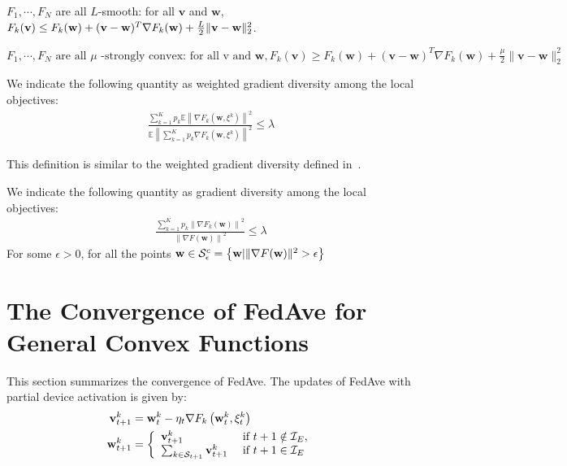 \begin{assumption}[L-smooth]
$F_{1}, \cdots, F_{N}$ are all $L$-smooth: for all  $\mathbf{v}$  and $\mathbf{w}$, $F_{k}(\mathbf{v}) \leq F_{k}(\mathbf{w})+(\mathbf{v}- \\ \mathbf{w})^{T} \nabla F_{k}(\mathbf{w})+\frac{L}{2}\|\mathbf{v}-\mathbf{w}\|_{2}^{2}$.
\label{ass:lsmooth}
\end{assumption}
\begin{assumption}
$	F_{1}, \cdots, F_{N} \text { are all } \mu \text { -strongly convex: for all v and } \mathbf{w}, F_{k}(\mathbf{v}) \geq F_{k}(\mathbf{w})+(\mathbf{v}-\mathbf{w})^{T} \nabla F_{k}(\mathbf{w})+\frac{\mu}{2}\|\mathbf{v}-\mathbf{w}\|_{2}^{2}$
\label{ass:stroncvx}
\end{assumption}

\begin{definition}
	We indicate the following quantity as weighted gradient diversity among the local 
	objectives:
	\begin{align*}
		\frac{\sum_{k=1}^K p_k  \mathbb{E}\left\|\nabla F_{k}\left(\mathbf{w}, \xi^{k}\right)\right\|^{2} }{\mathbb{E}\left\| \sum_{k=1}^K p_k   \nabla F_{k}\left(\mathbf{w}, \xi^{k}\right)\right\|^{2} } \leq \lambda 
	\end{align*}
\end{definition}
This definition is similar to the weighted gradient diversity defined in~\cite{haddadpour2019convergence}.

\begin{definition}
	We indicate the following quantity as gradient diversity among the local 
	objectives:
	\begin{align*}
		\frac{\sum_{k=1}^K p_k \left\|\nabla F_{k}\left(\mathbf{w}\right)\right\|^{2} }{\left\|   \nabla F\left(\mathbf{w}\right)\right\|^{2} } \leq \lambda 
	\end{align*}
	For some $\epsilon>0$, for all the points ${\mathbf{w}} \in \mathcal{S}_{\epsilon}^{c}=\left\{{\mathbf{w}} |\|\nabla F({\mathbf{w}})\|^{2}>\epsilon\right\}$
\end{definition}

\section{The Convergence of FedAve for General Convex Functions}
This section summarizes the convergence of FedAve.
The updates of FedAve with partial device activation is given by: 
\begin{align} 
\mathbf{v}_{t+1}^{k} &=\mathbf{w}_{t}^{k}-\eta_{t} \nabla F_{k}\left(\mathbf{w}_{t}^{k}, \xi_{t}^{k}\right) \\ \mathbf{w}_{t+1}^{k} &=\left\{\begin{array}{ll}\mathbf{v}_{t+1}^{k} & \text { if } t+1 \notin \mathcal{I}_{E}, \\ 
\sum_{k \in {\mathcal{S}}_{t+1}} \mathbf{v}_{t+1}^{k} & \text { if } t+1 \in \mathcal{I}_{E}\end{array}\right.
\end{align}

